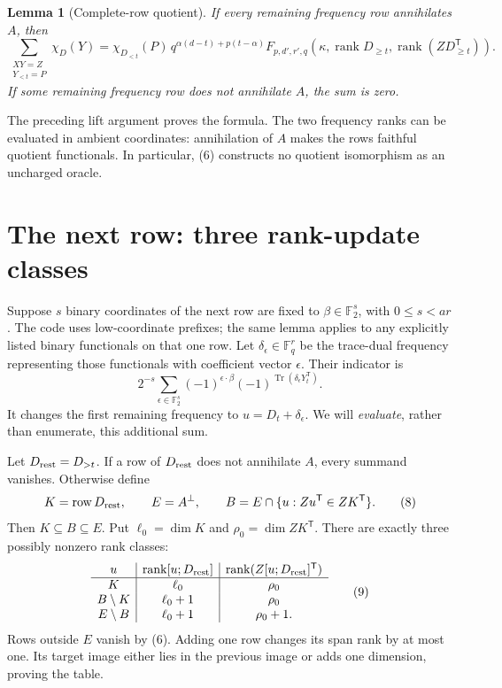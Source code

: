 \documentclass[11pt]{article}
\newtheorem{lemma}[theorem]{Lemma}
\newcommand{\F}{\mathbb F}
\newcommand{\Tr}{\operatorname{Tr}}
\newcommand{\rank}{\operatorname{rank}}
\newcommand{\row}{\operatorname{row}}
\begin{document}
\begin{lemma}[Complete-row quotient]
If every remaining frequency row annihilates $A$, then
\[
 \sum_{\substack{XY=Z\\Y_{<t}=P}}\chi_D(Y)
 =
 \chi_{D_{<t}}(P)\,
 q^{\alpha(d-t)+p(t-\alpha)}
 F_{p,d',r',q}(\kappa,\rank D_{\ge t},
                            \rank(ZD_{\ge t}^{\mathsf T})).
 \tag{6}
\]
If some remaining frequency row does not annihilate $A$, the sum is zero.
\end{lemma}
The preceding lift argument proves the formula. The two frequency ranks can
be evaluated in ambient coordinates: annihilation of $A$ makes the rows
faithful quotient functionals. In particular, (6) constructs no quotient
isomorphism as an uncharged oracle.

\section{The next row: three rank-update classes}

Suppose $s$ binary coordinates of the next row are fixed to
$\beta\in\F_2^s$, with $0\le s<ar$. The code uses low-coordinate prefixes;
the same lemma applies to any explicitly listed binary functionals on that
one row. Let $\delta_\epsilon\in\F_q^r$ be the trace-dual frequency
representing those functionals with coefficient vector $\epsilon$.
Their indicator is
\[
 2^{-s}\sum_{\epsilon\in\F_2^s}
       (-1)^{\epsilon\cdot\beta}
       (-1)^{\Tr(\delta_\epsilon Y_t^{\mathsf T})}.
 \tag{7}
\]
It changes the first remaining frequency to $u=D_t+\delta_\epsilon$.
We will \emph{evaluate}, rather than enumerate, this additional sum.

Let $D_{\rm rest}=D_{>t}$. If a row of $D_{\rm rest}$ does not annihilate
$A$, every summand vanishes. Otherwise define
\[
 K=\row D_{\rm rest},\qquad E=A^\perp,\qquad
 B=E\cap\{u:Zu^{\mathsf T}\in ZK^{\mathsf T}\}.
 \tag{8}
\]
Then $K\subseteq B\subseteq E$. Put
$\ell_0=\dim K$ and $\rho_0=\dim ZK^{\mathsf T}$.
There are exactly three possibly nonzero rank classes:
\[
\begin{array}{c|c|c}
 u&\rank [u;D_{\rm rest}]&
       \rank(Z[u;D_{\rm rest}]^{\mathsf T})\\ \hline
 K&\ell_0&\rho_0\\
 B\setminus K&\ell_0+1&\rho_0\\
 E\setminus B&\ell_0+1&\rho_0+1 .
\end{array}                                                   \tag{9}
\]
Rows outside $E$ vanish by (6). Adding one row changes its span rank by at
most one. Its target image either lies in the previous image or adds one
dimension, proving the table.
\end{document}
